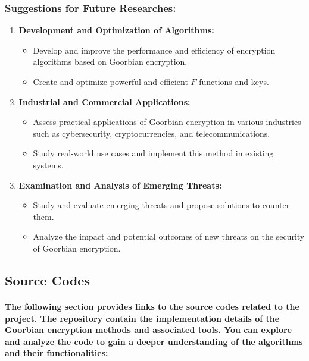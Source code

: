 \documentclass[oneside]{book}
\newcommand{\myparagraph}[1]{\paragraph{\textnormal{#1}}}
\begin{document}
\subsubsection*{Suggestions for Future Researches:}

\begin{enumerate}
    \item \textbf{Development and Optimization of Algorithms:}
    \begin{itemize}
        \item Develop and improve the performance and efficiency of encryption algorithms based on Goorbian encryption.
        \item Create and optimize powerful and efficient $F$ functions and keys.
    \end{itemize}
    \item \textbf{Industrial and Commercial Applications:}
    \begin{itemize} 
        \item Assess practical applications of Goorbian encryption in various industries such as cybersecurity, cryptocurrencies, and telecommunications. 
        \item Study real-world use cases and implement this method in    existing systems.
    \end{itemize}
    \item \textbf{Examination and Analysis of Emerging Threats:}
    \begin{itemize}
        \item Study and evaluate emerging threats and propose solutions to counter them.
        \item Analyze the impact and potential outcomes of new threats on the security of Goorbian encryption.
    \end{itemize}
\end{enumerate}

\newpage

\label{subsec:codes}
\subsection{Source Codes}

\myparagraph{
The following section provides links to the source codes related to the project. The repository contain the implementation details of the \textbf{Goorbian encryption} methods and associated tools. You can explore and analyze the code to gain a deeper understanding of the algorithms and their functionalities:
}
\end{document}
